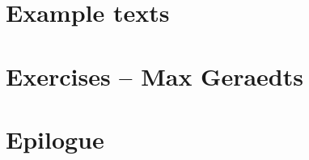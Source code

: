 \documentclass[twoside, openany, 12pt, a5paper]{book}
\begin{document}
\chapter{Example texts}

\chapter{Exercises -- {\small Max Geraedts}} 
\backmatter

\chapter{Epilogue}





\pagebreak
\shipout\null
\shipout\null
\shipout\null
\pagebreak
\thispagestyle{empty}

\end{document}
